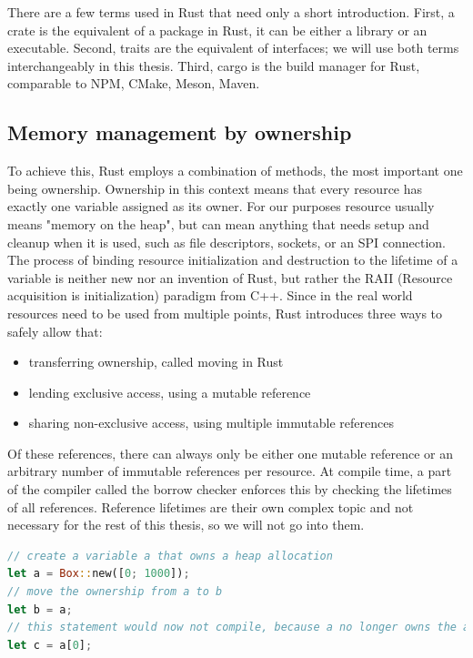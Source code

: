 There are a few terms used in Rust that need only a short introduction.
First, a crate is the equivalent of a package in Rust, it can be either a library or an executable.
Second, traits are the equivalent of interfaces; we will use both terms interchangeably in this thesis.
Third, cargo is the build manager for Rust, comparable to NPM, CMake, Meson, Maven.

\subsection{Memory management by ownership}
\label{sec:background:rust:ownership}

To achieve this, Rust employs a combination of methods, the most important one being ownership.
Ownership in this context means that every resource has exactly one variable assigned as its owner.
For our purposes resource usually means "memory on the heap",
but can mean anything that needs setup and cleanup when it is used,
such as file descriptors, sockets, or an SPI connection.
The process of binding resource initialization and destruction to the lifetime of a variable is neither new
nor an invention of Rust,
but rather the RAII (Resource acquisition is initialization) paradigm from C++.
Since in the real world resources need to be used from multiple points, Rust introduces three ways to safely allow that:
\begin{itemize}
    \item transferring ownership, called moving in Rust
    \item lending exclusive access, using a mutable reference
    \item sharing non-exclusive access, using multiple immutable references
\end{itemize}

Of these references, there can always only be either one mutable reference or an arbitrary number of immutable references per resource.
At compile time, a part of the compiler called the borrow checker enforces this by checking the lifetimes of all references.
Reference lifetimes are their own complex topic and not necessary for the rest of this thesis, so we will not go into them.

\begin{lstlisting}[language=Rust,style=colouredRust]
// create a variable a that owns a heap allocation
let a = Box::new([0; 1000]);
// move the ownership from a to b
let b = a;
// this statement would now not compile, because a no longer owns the allocation
let c = a[0];
\end{lstlisting}

